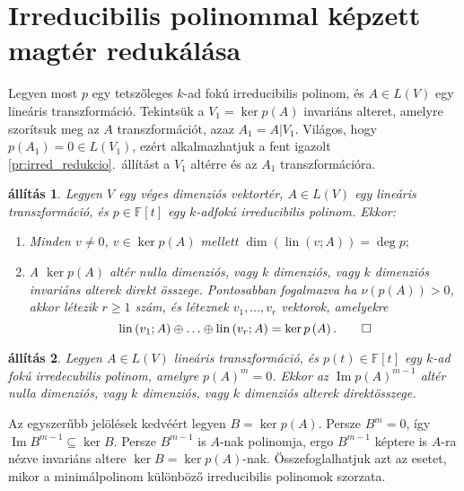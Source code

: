 \documentclass[a4paper, showtrims]{memoir}
\makeatletter
\renewenvironment{proof}[1][\proofname]
    {\par\pushQED{\qed}%
    \normalfont \topsep6\p@\@plus6\p@\relax
    \trivlist
    \item[\hskip\labelsep
        \itshape
    #1\@addpunct{:}]\ignorespaces}
    {\popQED\endtrivlist\@endpefalse}
\theoremstyle{plain}
\newtheorem{proposition}{állítás}[chapter]
\theoremstyle{remark}
\theoremstyle{definition}
\DeclareMathOperator{\lin}{lin}
\DeclareMathOperator{\im}{Im}
\makeatother
\begin{document}
\section{Irreducibilis polinommal képzett magtér redukálása}
Legyen most $p$ egy tetszőleges $k$-ad fokú irreducibilis polinom,
és $A\in L(V)$ egy lineáris transzformáció.
Tekintsük a $V_1=\ker p\left( A \right)$ invariáns alteret, amelyre szorítsuk meg az $A$
transzformációt, azaz $A_1=A|V_1$.
Világos, hogy $p\left( A_1 \right)=0\in L\left( V_1 \right)$,
ezért alkalmazhatjuk a fent igazolt \ref{pr:irred_redukcio}.~állítást
a $V_1$ altérre és az $A_1$ transzformációra.
\begin{proposition}\label{pr:csaba}
	Legyen $V$ egy véges dimenziós vektortér, $A\in L\left( V \right)$ egy lineáris transzformáció,
	és $p\in\mathbb{F}\left[ t \right]$ egy $k$-adfokú irreducibilis polinom.
	Ekkor:
	\begin{enumerate}
		\item Minden $v\neq 0$, $v\in\ker p\left( A \right)$ mellett
		      \(
		      \dim\left( \lin(v;A) \right)=\deg p;
		      \)
		\item A $\ker p\left( A \right)$ altér nulla dimenziós,
		      vagy $k$ dimenziós, vagy $k$ dimenziós invariáns alterek direkt összege.
		      Pontosabban fogalmazva
		      ha $\nu\left(p(A) \right)>0$, akkor létezik $r\geq 1$ szám,
		      és léteznek $v_1,\ldots,v_r$ vektorok, amelyekre
		      \[
			      \lin\left( v_1;A \right)\oplus\ldots\oplus \lin\left( v_r;A \right)
			      =
			      \ker p\left( A \right).
			      \qedhere
		      \]
	\end{enumerate}
\end{proposition}
\begin{proposition}
    Legyen $A\in L\left( V \right)$ lineáris transzformáció, és $p(t)\in\mathbb{F}[t]$ egy $k$-ad fokú 
    irredecubilis polinom,
    amelyre $p\left( A \right)^m=0$.
    Ekkor az $\im p\left( A \right)^{m-1}$ altér nulla dimenziós, 
    vagy $k$ dimenziós, vagy $k$ dimenziós alterek direktösszege.
\end{proposition}
\begin{proof}
    Az egyszerűbb jelölések kedvéért legyen $B=\ker p\left( A \right)$.
    Persze $B^m=0$, így $\im B^{m-1}\subseteq\ker B $.
    Persze $B^{m-1}$ is $A$-nak polinomja, 
    ergo $B^{m-1}$ képtere is $A$-ra nézve invariáns altere $\ker B=\ker p\left( A \right)$-nak.
\end{proof}
Összefoglalhatjuk azt az esetet,
mikor a minimálpolinom különböző irreducibilis polinomok szorzata.
\end{document}
